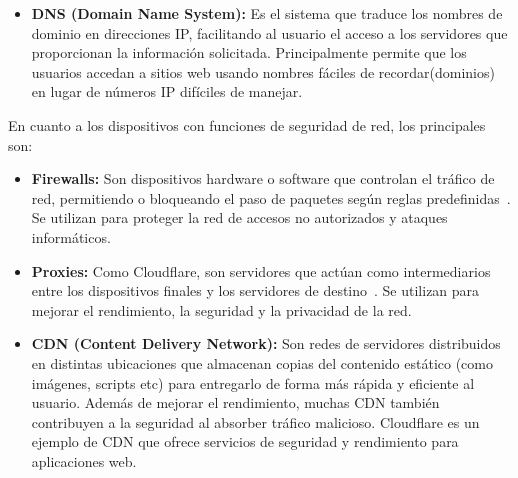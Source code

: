 \begin{itemize}
	\item \textbf{DNS (Domain Name System):} Es el sistema que traduce los nombres de dominio en direcciones IP, facilitando al usuario el acceso a los servidores que proporcionan la información solicitada. Principalmente permite que los usuarios accedan a sitios web usando nombres fáciles de recordar(dominios) en lugar de números IP difíciles de manejar.

\end{itemize}


En cuanto a los dispositivos con funciones de seguridad de red, los principales son:
\begin{itemize}
	\item \textbf{Firewalls:} Son dispositivos hardware o software que controlan el tráfico de red, permitiendo o bloqueando el paso de paquetes según reglas predefinidas~\cite{SushilJajodia2025}. Se utilizan para proteger la red de accesos no autorizados y ataques informáticos. 

	\item \textbf{Proxies:} Como Cloudflare, son servidores que actúan como intermediarios entre los dispositivos finales y los servidores de destino~\cite{SushilJajodia2025}. Se utilizan para mejorar el rendimiento, la seguridad y la privacidad de la red. 

	\item \textbf{CDN (Content Delivery Network):} Son redes de servidores distribuidos en distintas ubicaciones que almacenan copias del contenido estático (como imágenes, scripts etc) para entregarlo de forma más rápida y eficiente al usuario. Además de mejorar el rendimiento, muchas CDN también contribuyen a la seguridad al absorber tráfico malicioso. Cloudflare es un ejemplo de CDN que ofrece servicios de seguridad y rendimiento para aplicaciones web.
\end{itemize}

